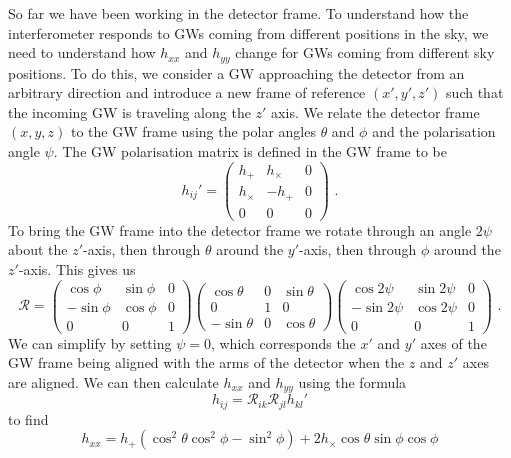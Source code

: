 \documentclass[11pt]{cuthesis}
\newcommand{\fs}{\text{ .}}
\begin{document}
So far we have been working in the detector frame. To understand how the interferometer responds to GWs coming from different positions in the sky, we need to understand how $h_{xx}$ and $h_{yy}$ change for GWs coming from different sky positions. To do this, we consider a GW approaching the detector from an arbitrary direction and introduce a new frame of reference $(x',y',z')$ such that the incoming GW is traveling along the $z'$ axis. We relate the detector frame $(x,y,z)$ to the GW frame using the polar angles $\theta$ and $\phi$ and the polarisation angle $\psi$. The GW polarisation matrix is defined in the GW frame to be
\begin{equation}
h_{ij}'
=
\begin{pmatrix}
h_+ & h_\times & 0 \\
h_\times & -h_+ & 0 \\
0 & 0 & 0
\end{pmatrix} \fs
\end{equation}
To bring the GW frame into the detector frame we rotate through an angle $2\psi$ about the $z'$-axis, then through $\theta$ around the $y'$-axis, then through $\phi$ around the $z'$-axis. This gives us
\begin{equation}
\mathcal{R}
=
\begin{pmatrix}
\cos \phi & \sin \phi & 0 \\
-\sin \phi & \cos \phi & 0 \\
0 & 0 & 1
\end{pmatrix}
\begin{pmatrix}
\cos \theta & 0 & \sin \theta \\
0 & 1 & 0 \\
-\sin \theta & 0 & \cos \theta
\end{pmatrix}
\begin{pmatrix}
\cos 2\psi & \sin 2\psi & 0 \\
-\sin 2\psi & \cos 2\psi & 0 \\
0 & 0 & 1
\end{pmatrix}
 \fs
\end{equation}
We can simplify by setting $\psi=0$, which corresponds the $x'$ and $y'$ axes of the GW frame being aligned with the arms of the detector when the $z$ and $z'$ axes are aligned. We can then calculate $h_{xx}$ and $h_{yy}$ using the formula
\begin{equation}
h_{ij} = \mathcal{R}_{ik} \mathcal{R}_{jl} h_{kl}'
\end{equation}
to find
\begin{equation}
h_{xx} = h_+(\cos^2 \theta \cos^2 \phi - \sin^2 \phi) + 2h_\times \cos \theta \sin\phi \cos\phi
\end{equation}
\end{document}
